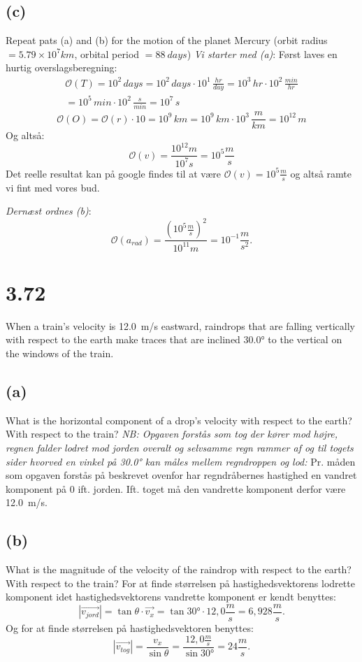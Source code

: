 \documentclass[12pt]{article}
\begin{document}
	\subsection*{(c)}
	Repeat pats (a) and (b) for the motion of the planet Mercury (orbit radius $ = 5.79 \times 10^7 \si{ km}$,
	orbital period $= \qty{88}{days}$)
	\bigbreak
	\textit{Vi starter med (a)}:
	Først laves en hurtig overslagsberegning:
	\begin{gather*}
		\mathcal{O}(T) = 10^2 \,days = 10^2 \,days \cdot 10^1 \,\frac{hr}{day} =  10^3 \,hr \cdot 10^2 \,\frac{min}{hr} \\
		= 10^5 \,min \cdot 10^2 \,\frac{s}{min} = 10^7 \,s 
	\end{gather*}	
	\[
		\mathcal{O}(O) = \mathcal{O}(r) \cdot 10 = 10^9 \,km = 10^9 \,km \cdot 10^3 \,\frac{m}{km} = 10^{12} \,m
	\] 
	Og altså:
	\[
		\mathcal{O}(v) = \frac{10^{12} m}{10^7 s} = 10^5 \frac{m}{s}
	\]
	Det reelle resultat kan på google findes til at være $\mathcal{O}(v) = 10^5 \frac{m}{s}$ og altså ramte vi fint med vores bud.

	\bigreak

	\textit{Dernæst ordnes (b)}:
	\[
		\mathcal{O}(a_{rad}) = \frac{(10^5 \frac{m}{s})^2}{10^{11} m} = 10^{-1} \frac{m}{s^2}
	.\] 

	

\section*{3.72}
	When a train's velocity is \qty{12.0}{m/s} eastward, raindrops that are falling vertically with respect to the earth make traces that are inclined \ang{30.0} to the vertical on the windows of the train.

	\subsection*{(a)}
	What is the horizontal component of a drop's velocity with respect to the earth? With respect to the train?
	\bigbreak
	\textit{NB: Opgaven forstås som tog der kører mod højre, regnen falder lodret mod jorden overalt og selvsamme regn rammer af og til togets sider hvorved en vinkel på \ang{30.0} kan måles mellem regndroppen og lod:}
	\bigbreak
	Pr. måden som opgaven forstås på beskrevet ovenfor har regndråbernes hastighed en vandret komponent på 0 ift. jorden. Ift. toget må den vandrette komponent derfor være \qty{12,0}{m/s}. 

	\subsection*{(b)}
	What is the magnitude of the velocity of the raindrop with respect to the earth? With respect to the train?
	For at finde størrelsen på hastighedsvektorens lodrette komponent idet hastighedsvektorens vandrette komponent er kendt benyttes:
	\[
		|\Vec{v_{jord}}| = \tan \theta \cdot \Vec{v_x} = \tan \ang{30} \cdot 12,0 \frac{m}{s} = 6,928 \frac{m}{s}
	.\]
	Og for at finde størrelsen på hastighedsvektoren benyttes:
	\[
		|\Vec{v_{tog}}| = \frac{v_x}{\sin \theta} = \frac{12,0 \frac{m}{s}}{\sin \ang{30}} = 24 \frac{m}{s}
	.\]
\end{document}
